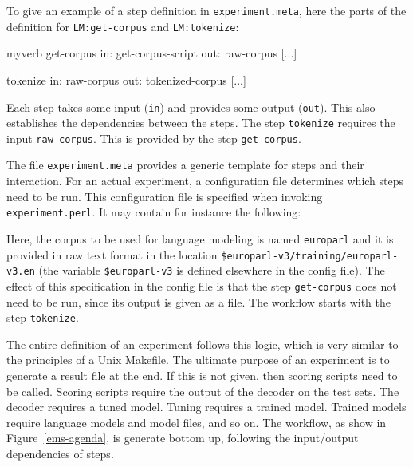 \documentclass{pbml}
\begin{document}
To give an example of a step definition in {\tt experiment.meta}, here the parts of the definition for {\tt LM:get-corpus} and {\tt LM:tokenize}:

\vspace{2mm}
\begin{SaveVerbatim}{myverb}
 get-corpus
        in: get-corpus-script
        out: raw-corpus
        [...]

 tokenize
        in: raw-corpus
        out: tokenized-corpus
        [...]
\end{SaveVerbatim}
\colorbox{gray}{%
}
\vspace{2mm}

Each step takes some input ({\tt in}) and provides some output ({\tt out}). This also establishes the dependencies between the steps. The step {\tt tokenize} requires the input {\tt raw-corpus}. This is provided by the step {\tt get-corpus}.

The file {\tt experiment.meta} provides a generic template for steps and their interaction. For an actual experiment, a configuration file determines which steps need to be run. This configuration file is specified when invoking {\tt experiment.perl}. It may contain for instance the following:

\vspace{2mm}
\colorbox{gray}{%
}
\vspace{2mm}

Here, the corpus to be used for language modeling is named {\tt europarl} and it is provided in raw text format in the location {\tt \$europarl-v3/training/europarl-v3.en} (the variable {\tt \$europarl-v3} is defined elsewhere in the config file). The effect of this specification in the config file is that the step {\tt get-corpus} does not need to be run, since its output is given as a file. The workflow starts with the step {\tt tokenize}.

The entire definition of an experiment follows this logic, which is very similar to the principles of a Unix Makefile. The ultimate purpose of an experiment is to generate a result file at the end. If this is not given, then scoring scripts need to be called. Scoring scripts require the output of the decoder on the test sets. The decoder requires a tuned model. Tuning requires a trained model. Trained models require language models and model files, and so on. The workflow, as show in Figure~\ref{ems-agenda}, is generate bottom up, following the input/output dependencies of steps.
\end{document}

